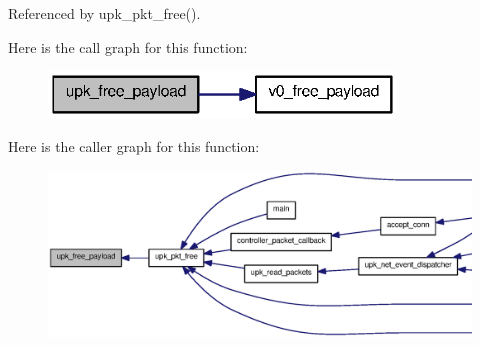 Referenced by upk\_\-pkt\_\-free().



Here is the call graph for this function:\nopagebreak
\begin{figure}[H]
\begin{center}
\leavevmode
\includegraphics[width=262pt]{upk__protocol_8c_a4bf94cc8e7458fd891a91dde470be196_cgraph}
\end{center}
\end{figure}




Here is the caller graph for this function:\nopagebreak
\begin{figure}[H]
\begin{center}
\leavevmode
\includegraphics[width=400pt]{upk__protocol_8c_a4bf94cc8e7458fd891a91dde470be196_icgraph}
\end{center}
\end{figure}


